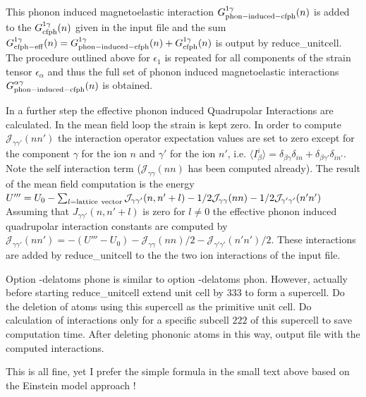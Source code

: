 \begin{description}
\begin{description}
\begin{description}
   This phonon induced magnetoelastic interaction 
     $G^{1\gamma}_{\rm phon-induced-cfph}(n)$ is added to the $G^{1\gamma}_{\rm cfph}(n)$
    given in the input file and the sum 
    $G^{1\gamma}_{\rm cfph-eff}(n)=G^{1\gamma}_{\rm phon-induced-cfph}(n)+G^{1\gamma}_{\rm cfph}(n)$
   is output by {\prg reduce\_unitcell}.
   The procedure outlined above for $\epsilon_1$ is repeated for all components of the strain
   tensor $\epsilon_{\alpha}$ and thus the full set of phonon induced magnetoelastic
   interactions $G^{\alpha\gamma}_{\rm phon-induced-cfph}(n)$ is obtained.
\item[Calculation of effective phonon induced Quadrupolar Interactions]
 In a further step the effective phonon induced Quadrupolar Interactions are calculated.
 In the mean field loop the strain is kept zero. In order to compute
 $\mathcal J_{\gamma\gamma'}(nn')$ the
interaction operator expectation values are set to zero 
         except for the 
 component $\gamma$ for the ion $n$ and $\gamma'$ for the ion $n'$, i.e.
  $\langle I^i_{\beta}\rangle=\delta_{\beta\gamma}\delta_{in}+\delta_{\beta\gamma'}\delta_{in'}$. 
 Note the self interaction term ($\mathcal J_{\gamma\gamma}(nn)$ has been computed already).
 The result of the mean field computation is the energy 
 $U'''=U_0-\sum_{l=\rm lattice\ vector}\mathcal J_{\gamma\gamma'}(n,n'+l)-1/2 \mathcal J_{\gamma\gamma}(nn)-1/2 \mathcal J_{\gamma'\gamma'}(n'n')$ 
 Assuming that  $J_{\gamma\gamma'}(n,n'+l)$ is zero for $l\neq 0$ the
 effective phonon induced quadrupolar interaction constants are computed by
 $\mathcal J_{\gamma\gamma'}(nn')=-(U'''-U_0)-\mathcal J_{\gamma\gamma}(nn)/2-\mathcal J_{\gamma'\gamma'}(n'n')/2$.
 These interactions are added by {\prg reduce\_unitcell} 
 to the the two ion interactions of the input file.
\end{description}
\item[Option: -delatoms phone 3 3 3 2 2 2]
   Option {\prg-delatoms phone} is similar to option {\prg -delatoms phon}.
  However, actually before starting {\prg reduce\_unitcell} extend
  unit cell by $3 3 3$ to form a supercell. Do the deletion of atoms
  using this supercell as the primitive unit cell. Do calculation of
  interactions only for a specific subcell $2 2 2$ of this supercell to save
  computation time. After deleting phononic atoms in this way, output
  file with the computed interactions. 

\OO This is all fine, yet I prefer the simple formula in the small text above 
based on the Einstein model approach !


\end{description}
\end{description}
